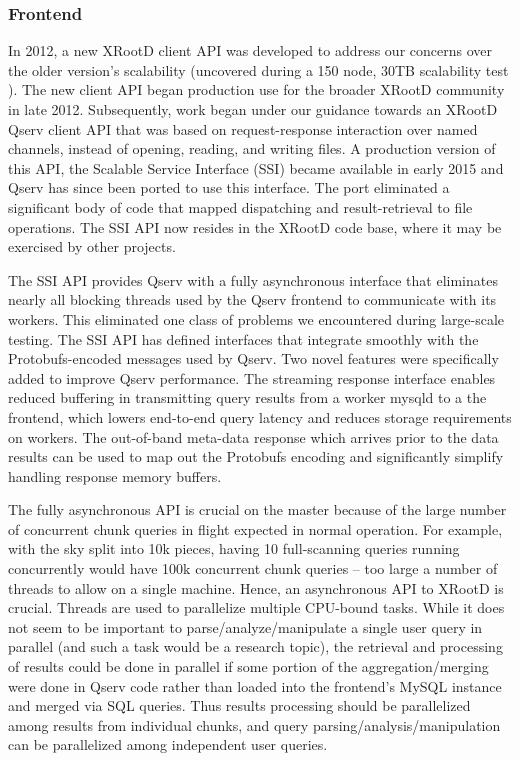 \documentclass[DM,toc]{lsstdoc}
\begin{document}
\subsubsection{Frontend}\label{frontend}

In 2012, a new XRootD client API was developed to address our concerns over
the older version's scalability (uncovered during a 150 node, 30TB scalability
test ). The new client API began production use for the
broader XRootD community in late 2012. Subsequently, work began under our
guidance towards an XRootD Qserv client API that was based on request-response
interaction over named channels, instead of opening, reading, and writing
files. A production version of this API, the Scalable Service Interface (SSI)
became available in early 2015 and Qserv has since been ported to use this
interface. The port eliminated a significant body of code that mapped
dispatching and result-retrieval to file operations. The SSI API now resides
in the XRootD code base, where it may be exercised by other projects.

The SSI API provides Qserv with a fully asynchronous interface that eliminates
nearly all blocking threads used by the Qserv frontend to communicate with its
workers. This eliminated one class of problems we encountered during large-scale
testing. The SSI API has defined interfaces that integrate smoothly with
the Protobufs-encoded messages used by Qserv. Two novel features were
specifically added to improve Qserv performance. The streaming response
interface enables reduced buffering in transmitting query results from a
worker mysqld to a the frontend, which lowers end-to-end query latency and
reduces storage requirements on workers. The out-of-band meta-data response
which arrives prior to the data results can be used to map out the Protobufs
encoding and significantly simplify handling response memory buffers.

The fully asynchronous API is crucial on the master because of the large
number of concurrent chunk queries in flight expected in normal operation. For
example, with the sky split into 10k pieces, having 10 full-scanning queries
running concurrently would have 100k concurrent chunk queries -- too large a
number of threads to allow on a single machine. Hence, an asynchronous API to
XRootD is crucial. Threads are used to parallelize multiple CPU-bound tasks.
While it does not seem to be important to parse/analyze/manipulate a single
user query in parallel (and such a task would be a research topic), the
retrieval and processing of results could be done in parallel if some portion
of the aggregation/merging were done in Qserv code rather than loaded into the
frontend's MySQL instance and merged via SQL queries. Thus results processing
should be parallelized among results from individual chunks, and query
parsing/analysis/manipulation can be parallelized among independent user
queries.
\end{document}
